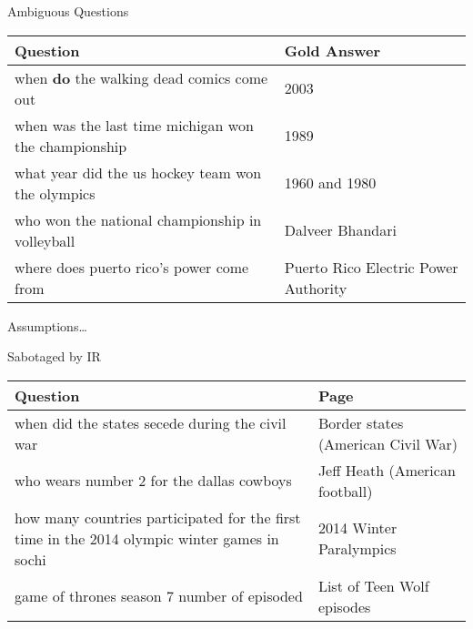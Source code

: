 \documentclass[xcolor=table]{beamer}
\begin{document}
\begin{frame}{Ambiguous Questions}
  \begin{small}
  \begin{tabular}{p{7cm}p{3cm}}
    \toprule
    Question & Gold Answer \\
    \hline
    \alert<1>{when {\bf do} the walking dead comics come out} & 2003 \\
    \alert<2>{when was the last time michigan won the championship} & 1989 \\
    \alert<3>{what year did the us hockey team won the olympics} & 1960 and 1980 \\
    \alert<4>{who won the national championship in volleyball} & Dalveer Bhandari \\
    \alert<5>{where does puerto rico's power come from} & Puerto Rico Electric Power Authority \\
    \bottomrule
  \end{tabular}
  \end{small}
  \begin{block}{Assumptions\dots}
  \end{block}
\end{frame}

\begin{frame}{Sabotaged by IR}

  \begin{small}
  \begin{tabular}{p{7cm}p{3cm}}
    \toprule
    Question & Page \\
    \hline
 when did the states secede during the civil war &  Border states (American Civil War) \\
 who wears number 2 for the dallas cowboys &  Jeff Heath (American football) \\
 how many countries participated for the first time in the 2014 olympic winter games in sochi & 2014 Winter Paralympics \\
 game of thrones season 7 number of episoded &  List of Teen Wolf episodes \\
 \bottomrule
  \end{tabular}
  \end{small}

\end{frame}
\end{document}
